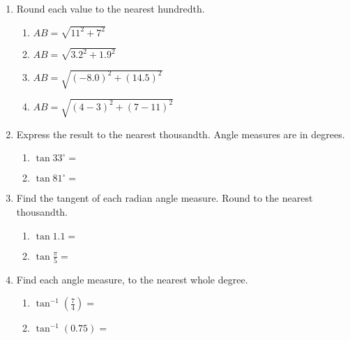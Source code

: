 \begin{enumerate}
  \item Round each value to the nearest hundredth. \vspace{.5cm}
  \begin{multicols}{2}
    \begin{enumerate}
      \item $AB=\sqrt{11^2+7^2}$ \vspace{3.5cm}
      \item $AB=\sqrt{3.2^2+1.9^2}$
      \item $AB=\sqrt{(-8.0)^2+(14.5)^2}$ \vspace{3.5cm}
      \item $AB=\sqrt{(4-3)^2+(7-11)^2}$
    \end{enumerate}
  \end{multicols} \vspace{1cm}

  \item Express the result to the nearest thousandth. Angle measures are in degrees. \vspace{.25cm}
  \begin{multicols}{2}
    \begin{enumerate}
      \item $\displaystyle \tan 33^\circ = $ \vspace{1cm}
      \item $\displaystyle \tan 81^\circ = $
    \end{enumerate}
  \end{multicols} \vspace{1cm}
  
  \item Find the tangent of each radian angle measure. Round to the nearest thousandth. \vspace{.25cm}
  \begin{multicols}{2}
    \begin{enumerate}
      \item $\displaystyle \tan 1.1 = $ \vspace{1cm}
      \item $\displaystyle \tan \frac{\pi}{5} = $
    \end{enumerate}
  \end{multicols} \vspace{1cm}

\item Find each angle measure, to the nearest whole degree.\vspace{.25cm}
\begin{multicols}{2}
  \begin{enumerate}
    \item $\displaystyle \tan^{-1} (\frac{7}{4}) = $ \vspace{1cm}
    \item $\tan^{-1} (0.75) =$
  \end{enumerate}
\end{multicols} \vspace{1cm}


\end{enumerate}
